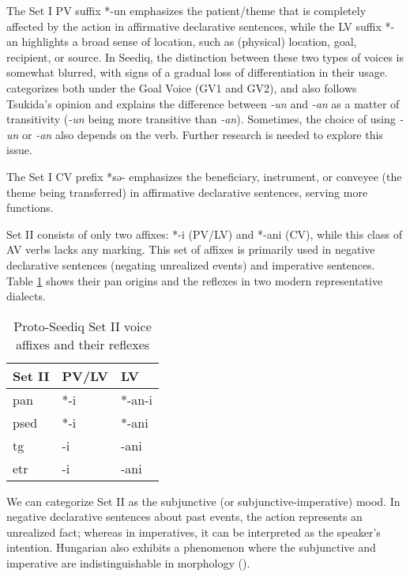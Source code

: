 The Set I PV suffix *-un emphasizes the patient/theme that is completely affected by the action in affirmative declarative sentences, while the LV suffix *-an highlights a broad sense of location, such as (physical) location, goal, recipient, or source. In Seediq, the distinction between these two types of voices is somewhat blurred, with signs of a gradual loss of differentiation in their usage. \textcite{tsukida2009} categorizes both under the Goal Voice (GV1 and GV2), and \textcite{tang2015} also follows Tsukida's opinion and explains the difference between \textit{-un} and \textit{-an} as a matter of transitivity (\textit{-un} being more transitive than \textit{-an}). Sometimes, the choice of using \textit{-un} or \textit{-an} also depends on the verb. Further research is needed to explore this issue.


The Set I CV prefix *sə- emphasizes the beneficiary, instrument, or conveyee (the theme being transferred) in affirmative declarative sentences, serving more functions.

Set II consists of only two affixes: *-i (PV/LV) and *-ani (CV), while this class of AV verbs lacks any marking. This set of affixes is primarily used in negative declarative sentences (negating unrealized events) and imperative sentences. Table \ref{tab:psed_voi_II} shows their \acl{pan} origins and the reflexes in two modern representative dialects.

\begin{table}[!htbp]
\centering
\caption{Proto-Seediq Set II voice affixes and their reflexes}
\label{tab:psed_voi_II}
\begin{tabular}{lll}
\hline
Set II    & PV/LV & LV     \\ \hline
\ac{pan}  & *-i   & *-an-i \\
\ac{psed} & *-i   & *-ani  \\
\ac{tg}   & -i    & -ani   \\
\ac{etr}  & -i    & -ani   \\ \hline
\end{tabular}
\end{table}

We can categorize Set II as the subjunctive (or subjunctive-imperative) mood. In negative declarative sentences about past events, the action represents an unrealized fact; whereas in imperatives, it can be interpreted as the speaker's intention. Hungarian also exhibits a phenomenon where the subjunctive and imperative are indistinguishable in morphology (\cite{toth2007}).


